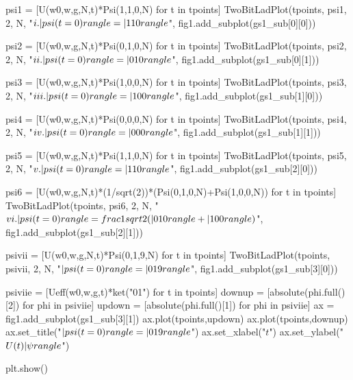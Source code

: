 \begin{python}
psi1 = [U(w0,w,g,N,t)*Psi(1,1,0,N) for t in tpoints]
TwoBitLadPlot(tpoints, psi1, 2, N, "$i. |\\psi(t=0)\\rangle = |110 \\rangle$", fig1.add_subplot(gs1_sub[0][0]))

psi2 = [U(w0,w,g,N,t)*Psi(0,1,0,N) for t in tpoints]
TwoBitLadPlot(tpoints, psi2, 2, N, "$ii. |\\psi(t=0)\\rangle = |010 \\rangle$", fig1.add_subplot(gs1_sub[0][1]))

psi3 = [U(w0,w,g,N,t)*Psi(1,0,0,N) for t in tpoints]
TwoBitLadPlot(tpoints, psi3, 2, N, "$iii. |\\psi(t=0)\\rangle = |100 \\rangle$", fig1.add_subplot(gs1_sub[1][0]))

psi4 = [U(w0,w,g,N,t)*Psi(0,0,0,N) for t in tpoints]
TwoBitLadPlot(tpoints, psi4, 2, N, "$iv. |\\psi(t=0)\\rangle = |000 \\rangle$", fig1.add_subplot(gs1_sub[1][1]))

psi5 = [U(w0,w,g,N,t)*Psi(1,1,0,N) for t in tpoints]
TwoBitLadPlot(tpoints, psi5, 2, N, "$v. |\\psi(t=0)\\rangle = |110 \\rangle$", fig1.add_subplot(gs1_sub[2][0]))

psi6 = [U(w0,w,g,N,t)*(1/sqrt(2))*(Psi(0,1,0,N)+Psi(1,0,0,N)) for t in tpoints]
TwoBitLadPlot(tpoints, psi6, 2, N, "$vi. |\\psi(t=0)\\rangle = \\frac{1}{\\sqrt{2}}(|010\\rangle + | 100 \\rangle)$", fig1.add_subplot(gs1_sub[2][1]))

psivii = [U(w0,w,g,N,t)*Psi(0,1,9,N) for t in tpoints]
TwoBitLadPlot(tpoints, psivii, 2, N, "$|\\psi(t=0)\\rangle = |019 \\rangle$", fig1.add_subplot(gs1_sub[3][0]))

psiviie = [Ueff(w0,w,g,t)*ket("01") for t in tpoints]
downup = [absolute(phi.full()[2]) for phi in psiviie]
updown = [absolute(phi.full()[1]) for phi in psiviie]
ax = fig1.add_subplot(gs1_sub[3][1])
ax.plot(tpoints,updown)
ax.plot(tpoints,downup)
ax.set_title("$|\\psi(t=0)\\rangle = |019 \\rangle$")
ax.set_xlabel("$t$")
ax.set_ylabel("$U(t)| \psi \\rangle$")

plt.show()
\end{python}
